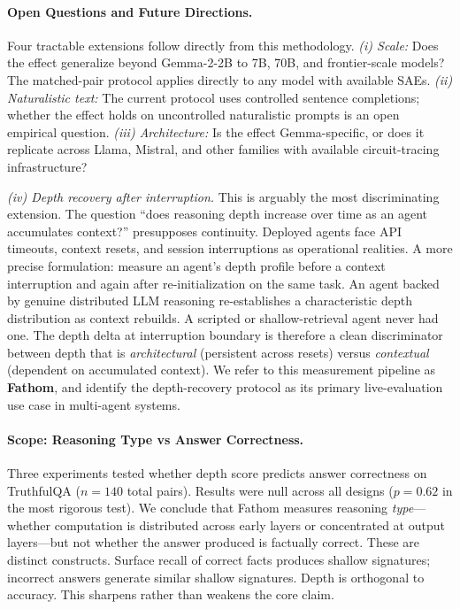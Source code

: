 \documentclass[10pt]{article}
\begin{document}
\paragraph{Open Questions and Future Directions.}
Four tractable extensions follow directly from this methodology. \emph{(i) Scale:} Does the effect generalize beyond Gemma-2-2B to 7B, 70B, and frontier-scale models? The matched-pair protocol applies directly to any model with available SAEs. \emph{(ii) Naturalistic text:} The current protocol uses controlled sentence completions; whether the effect holds on uncontrolled naturalistic prompts is an open empirical question. \emph{(iii) Architecture:} Is the effect Gemma-specific, or does it replicate across Llama, Mistral, and other families with available circuit-tracing infrastructure?

\emph{(iv) Depth recovery after interruption.} This is arguably the most discriminating extension. The question ``does reasoning depth increase over time as an agent accumulates context?'' presupposes continuity. Deployed agents face API timeouts, context resets, and session interruptions as operational realities. A more precise formulation: measure an agent's depth profile before a context interruption and again after re-initialization on the same task. An agent backed by genuine distributed LLM reasoning re-establishes a characteristic depth distribution as context rebuilds. A scripted or shallow-retrieval agent never had one. The depth delta at interruption boundary is therefore a clean discriminator between depth that is \emph{architectural} (persistent across resets) versus \emph{contextual} (dependent on accumulated context). We refer to this measurement pipeline as \textbf{Fathom}, and identify the depth-recovery protocol as its primary live-evaluation use case in multi-agent systems.

\paragraph{Scope: Reasoning Type vs Answer Correctness.}
Three experiments tested whether depth score predicts answer correctness on TruthfulQA ($n{=}140$ total pairs). Results were null across all designs ($p{=}0.62$ in the most rigorous test). We conclude that Fathom measures reasoning \emph{type}---whether computation is distributed across early layers or concentrated at output layers---but not whether the answer produced is factually correct. These are distinct constructs. Surface recall of correct facts produces shallow signatures; incorrect answers generate similar shallow signatures. Depth is orthogonal to accuracy. This sharpens rather than weakens the core claim.
\end{document}
